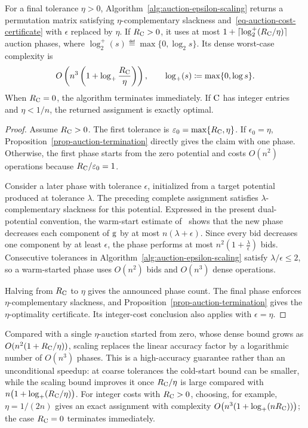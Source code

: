\begin{prop}\label{prop-auction-epsilon-scaling}
	For a final tolerance $\eta>0$, Algorithm~\ref{alg:auction-epsilon-scaling} returns a permutation matrix satisfying $\eta$-complementary slackness and~\eqref{eq-auction-cost-certificate} with $\epsilon$ replaced by $\eta$. If $R_{\mathrm{C}}>0$, it uses at most
	$1+\lceil\log_2^+(R_{\mathrm{C}}/\eta)\rceil$ auction phases, where
	$\log_2^+(s)\eqdef\max\{0,\log_2 s\}$. Its dense worst-case complexity is
	\[
		O\left(n^3\left(1+\log_+\frac{R_{\mathrm{C}}}{\eta}\right)\right),
		\qquad
		\log_+(s)\coloneqq\max\{0,\log s\}.
	\]
	When $R_{\mathrm{C}}=0$, the algorithm terminates immediately. If $\mathrm{C}$ has integer entries and $\eta<1/n$, the returned assignment is exactly optimal.
\end{prop}
\begin{proof}
	Assume $R_{\mathrm{C}}>0$. The first tolerance is $\varepsilon_0=\max\{R_{\mathrm{C}},\eta\}$. If $\epsilon_0=\eta$, Proposition~\ref{prop-auction-termination} directly gives the claim with one phase. Otherwise, the first phase starts from the zero potential and costs $O(n^2)$ operations because $R_{\mathrm{C}}/\varepsilon_0=1$.

	Consider a later phase with tolerance $\epsilon$, initialized from a target potential produced at tolerance $\lambda$. The preceding complete assignment satisfies $\lambda$-complementary slackness for this potential. Expressed in the present dual-potential convention, the warm-start estimate of~\cite[Lem.~25]{merigot2020optimaltransportalgorithms} shows that the new phase decreases each component of $\mathrm{g}$ by at most $n(\lambda+\epsilon)$. Since every bid decreases one component by at least $\epsilon$, the phase performs at most
	\(n^2\left(1+\frac{\lambda}{\epsilon}\right)\)
	bids. Consecutive tolerances in Algorithm~\ref{alg:auction-epsilon-scaling} satisfy $\lambda/\epsilon\leq2$, so a warm-started phase uses $O(n^2)$ bids and $O(n^3)$ dense operations.

	Halving from $R_{\mathrm{C}}$ to $\eta$ gives the announced phase count. The final phase enforces $\eta$-complementary slackness, and Proposition~\ref{prop-auction-termination} gives the $\eta$-optimality certificate. Its integer-cost conclusion also applies with $\epsilon=\eta$.
\end{proof}

Compared with a single $\eta$-auction started from zero, whose dense bound grows as $O(n^2(1+R_{\mathrm{C}}/\eta))$, scaling replaces the linear accuracy factor by a logarithmic number of $O(n^3)$ phases. This is a high-accuracy guarantee rather than an unconditional speedup: at coarse tolerances the cold-start bound can be smaller, while the scaling bound improves it once $R_{\mathrm{C}}/\eta$ is large compared with $n\bigl(1+\log_+(R_{\mathrm{C}}/\eta)\bigr)$. For integer costs with $R_{\mathrm{C}}>0$, choosing, for example, $\eta=1/(2n)$ gives an exact assignment with complexity $O\bigl(n^3(1+\log_+(nR_{\mathrm{C}}))\bigr)$; the case $R_{\mathrm{C}}=0$ terminates immediately.

